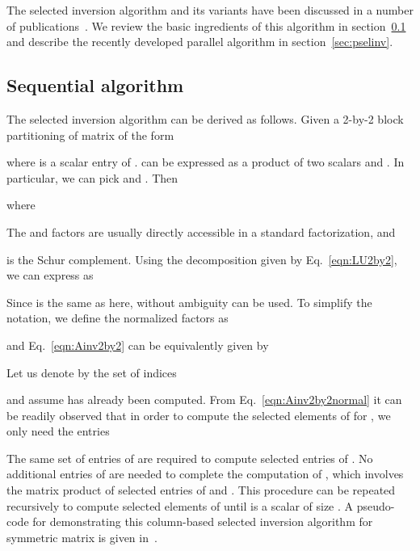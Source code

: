 \documentclass{acm_proc_article-sp}
\begin{document}
The selected inversion algorithm and its variants have been discussed
in a number of publications~\cite{TakahashiFaganChin1973,ErismanTinney1975,CampbellDavis1995,LiAhmedKlimeckDarve2008,LiDarve2012,LiWuDarve2013,HetmaniukZhaoAnantram2013,AmestoyDuffLExcellentEtAl2012,AmestoyDuffLExcellentEtAl2012a,PetersenLiStokbroEtAl2009,LinLuYingE2009,LinLuYingCarE2009,LinYangMezaEtAl2011,LinYangLuEtAl2011}.
We review the basic ingredients of this algorithm in section~\ref{subsec:basic} 
and describe the recently developed parallel algorithm in section~\ref{sec:pselinv}.

\subsection{Sequential algorithm} \label{subsec:basic}

The selected inversion algorithm can be derived as follows. 
Given a 2-by-2 block partitioning of matrix  of the form

where  is a scalar entry of . 
 can be expressed as a product of two scalars  and .
In particular, we can pick  and . Then 

where

The  and  factors are usually directly accessible in a standard
 factorization, and

is the Schur complement.  Using the decomposition given by 
Eq.~\eqref{eqn:LU2by2}, we can express  as

Since  is the same as  here, without
ambiguity  can be used.
To simplify the notation, we define the normalized  factors as

and Eq.~\eqref{eqn:Ainv2by2} can be equivalently given by 

Let us denote by  the set of indices
 
and assume  has already been computed. 
From Eq.~\eqref{eqn:Ainv2by2normal} it can be readily observed that
in order to compute the selected elements of 
 for ,  
we only need the entries 

The same set of entries of  are required to compute 
selected entries of . 
No additional entries of  are needed to complete
the computation of , which involves the matrix product 
of selected entries of  and .
This procedure can be repeated recursively to compute selected elements
of  until  is a scalar of size . A pseudo-code for
demonstrating this column-based selected inversion algorithm for symmetric matrix is
given in~\cite{LinYangMezaEtAl2011}.
\end{document}
